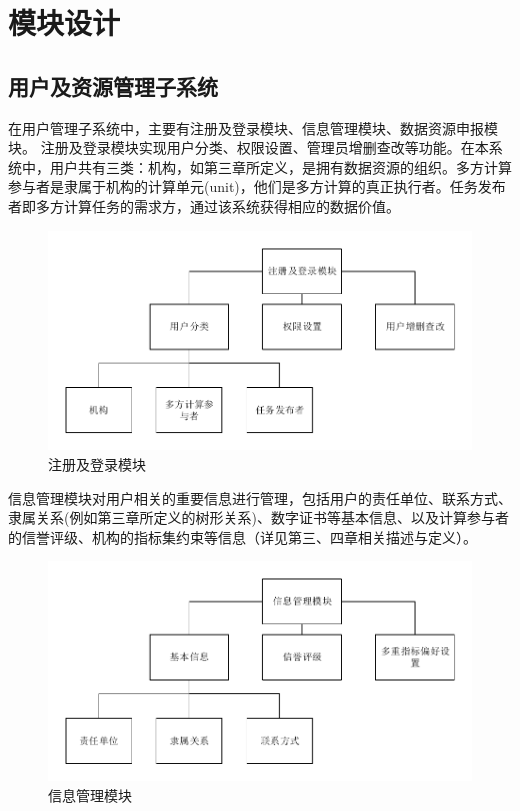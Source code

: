 \documentclass[promaster]{thesis-uestc}
\begin{document}
\section{模块设计}

\subsection{用户及资源管理子系统}

在用户管理子系统中，主要有注册及登录模块、信息管理模块、数据资源申报模块。
注册及登录模块实现用户分类、权限设置、管理员增删查改等功能。在本系统中，用户共有三类：机构，如第三章所定义，是拥有数据资源的组织。多方计算参与者是隶属于机构的计算单元(unit)，他们是多方计算的真正执行者。任务发布者即多方计算任务的需求方，通过该系统获得相应的数据价值。

\begin{figure}[h]
    \includegraphics[width=350pt]{pic/registerandlogin.pdf}
    \caption{注册及登录模块}
\end{figure}

信息管理模块对用户相关的重要信息进行管理，包括用户的责任单位、联系方式、隶属关系(例如第三章所定义的树形关系)、数字证书等基本信息、以及计算参与者的信誉评级、机构的指标集约束等信息（详见第三、四章相关描述与定义）。

\begin{figure}[H]
    \includegraphics[width=350pt]{pic/information.pdf}
    \caption{信息管理模块}
\end{figure}
\end{document}
